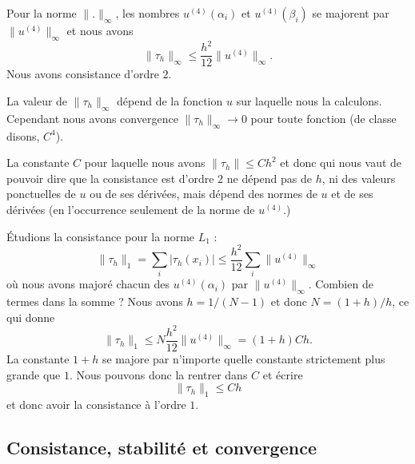 Pour la norme \(  \| . \|_{\infty}\), les nombres \( u^{(4)}(\alpha_i)\) et \( u^{(4)}(\beta_i)\) se majorent par \(  \| u^{(4)} \|_{\infty}\) et nous avons
\begin{equation}
	\| \tau_h \|_{\infty}\leq \frac{ h^2 }{ 12 }\| u^{(4)} \|_{\infty}.
\end{equation}
Nous avons consistance d'ordre \( 2\).

\begin{remark}
	La valeur de \( \| \tau_h \|_{\infty}\) dépend de la fonction \( u\) sur laquelle nous la calculons. Cependant nous avons convergence \( \| \tau_h \|_{\infty}\to 0\) pour toute fonction (de classe disons, \( C^4\)).

	La constante \( C\) pour laquelle nous avons \( \| \tau_h \|\leq Ch^2\) et donc qui nous vaut de pouvoir dire que la consistance est d'ordre \( 2\) ne dépend pas de \( h\), ni des valeurs ponctuelles de \( u\) ou de ses dérivées, mais dépend des normes de \( u\) et de ses dérivées (en l'occurrence seulement de la norme de \( u^{(4)}\).)
\end{remark}

Étudions la consistance pour la norme \( L_1\) :
\begin{equation}
	\| \tau_h \|_1=\sum_i| \tau_h(x_i) |\leq \frac{ h^2 }{ 12 }\sum_i\| u^{(4)} \|_{\infty}
\end{equation}
où nous avons majoré chacun des \( u^{(4)}(\alpha_i)\) par \( \| u^{(4)} \|_{\infty}\). Combien de termes dans la somme ? Nous avons \( h=1/(N-1)\) et donc \( N=(1+h)/h\), ce qui donne
\begin{equation}
	\| \tau_h \|_1\leq N\frac{ h^2 }{ 12 }\| u^{(4)} \|_{\infty}=(1+h)Ch.
\end{equation}
La constante \( 1+h\) se majore par n'importe quelle constante strictement plus grande que \( 1\). Nous pouvons donc la rentrer dans \( C\) et écrire
\begin{equation}
	\| \tau_h \|_1\leq Ch
\end{equation}
et donc avoir la consistance à l'ordre \( 1\).

\subsection{Consistance, stabilité et convergence}

